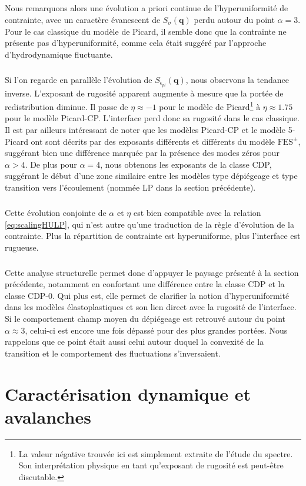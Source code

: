 \subparagraph{}Nous remarquons alors une évolution a priori continue de l'hyperuniformité de contrainte, avec un caractère évanescent de $S_\sigma(\mathbf{q})$ perdu autour du point $\alpha=3$. Pour le cas classique du modèle de Picard, il semble donc que la contrainte ne présente pas d'hyperuniformité, comme cela était suggéré par l'approche d'hydrodynamique fluctuante.

\subparagraph{}Si l'on regarde en parallèle l'évolution de $S_{\epsilon_{pl}}(\mathbf{q})$, nous observons la tendance inverse. L'exposant de rugosité apparent augmente à mesure que la portée de redistribution diminue. Il passe de $\eta\approx -1$ pour le modèle de Picard\footnote{La valeur négative trouvée ici est simplement extraite de l'étude du spectre. Son interprétation physique en tant qu'exposant de rugosité est peut-être discutable.} à $\eta\approx 1.75$ pour le modèle Picard-CP. L'interface perd donc sa rugosité dans le cas classique. Il est par ailleurs intéressant de noter que les modèles Picard-CP et le modèle 5-Picard ont sont décrits par des exposants différents et différents du modèle $\text{FES}^\pm$, suggérant bien une différence marquée par la présence des modes zéros pour $\alpha>4$. De plus pour $\alpha=4$, nous obtenons les exposants de la classe CDP, suggérant le début d'une zone similaire entre les modèles type dépiégeage et type transition vers l'écoulement (nommée LP dans la section précédente).

\subparagraph{}Cette évolution conjointe de $\alpha$ et $\eta$ est bien compatible avec la relation \autoref{eq:scalingHULP}, qui n'est autre qu'une traduction de la règle d'évolution de la contrainte. Plus la répartition de contrainte est hyperuniforme, plus l'interface est rugueuse.

\subparagraph{}Cette analyse structurelle permet donc d'appuyer le paysage présenté à la section précédente, notamment en confortant une différence entre la classe CDP et la classe CDP-0. Qui plus est, elle permet de clarifier la notion d'hyperuniformité dans les modèles élastoplastiques et son lien direct avec la rugosité de l'interface. Si le comportement champ moyen du dépiégeage est retrouvé autour du point $\alpha \approx 3$, celui-ci est encore une fois dépassé pour des plus grandes portées. Nous rappelons que ce point était aussi celui autour duquel la convexité de la transition et le comportement des fluctuations s'inversaient.

\section{Caractérisation dynamique et avalanches}


